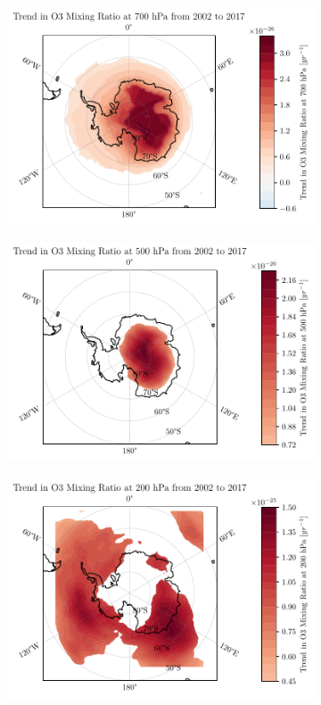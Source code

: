 \documentclass[../main.tex]{subfiles}
\begin{document}
\begin{figure}[!hbt]
    \begin{subfigure}[b]{0.5\textwidth}
    \includegraphics[width=\textwidth]{images/2021w5/chapter7/hres/trend_spatial_o3_700}
    \end{subfigure}
    \begin{subfigure}[b]{0.5\textwidth}
    \includegraphics[width=\textwidth]{images/2021w5/chapter7/hres/trend_spatial_o3_500}
    \end{subfigure}
    \begin{subfigure}[b]{0.5\textwidth}
    \includegraphics[width=\textwidth]{images/2021w5/chapter7/hres/trend_spatial_o3_200}

\end{subfigure}
\end{figure}
\end{document}
